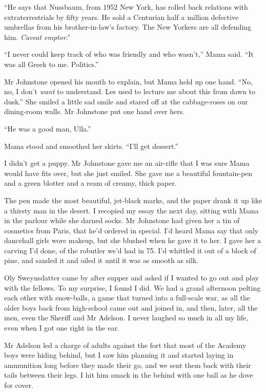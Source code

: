 ``He says that Nussbaum, from 1952 New York, has rolled back relations with 
extraterrestrials by fifty years. He sold a Centurian half a million defective 
umbrellas from his brother-in-law's factory. The New Yorkers are all defending 
him. \emph{Caveat emptor}.''

``I never could keep track of who was friendly and who wasn't,''
Mama said. ``It was all Greek to me. Politics.''

Mr Johnstone opened his mouth to explain, but Mama held up one
hand.
``No, no, I don't \emph{want} to understand. Les used to lecture me about this 
from dawn to dusk.''
She smiled a little sad smile and stared off at the cabbage-roses
on our dining-room walls. Mr Johnstone put one hand over hers.

``He was a good man, Ulla.''

Mama stood and smoothed her skirts. ``I'll get dessert.''

\tb

I didn't get a puppy. Mr Johnstone gave me an air-rifle that I was
sure Mama would have fits over, but she just smiled. She gave me a
beautiful fountain-pen and a green blotter and a ream of creamy,
thick paper.

The pen made the most beautiful, jet-black marks, and the paper
drank it up like a thirsty man in the desert. I recopied my essay
the next day, sitting with Mama in the parlour while she darned
socks. Mr Johnstone had given her a tin of cosmetics from Paris,
that he'd ordered in special. I'd heard Mama say that only
dancehall girls wore makeup, but she blushed when he gave it to
her. I gave her a carving I'd done, of the robutler we'd had in 75.
I'd whittled it out of a block of pine, and sanded it and oiled it
until it was as smooth as silk.

Oly Sweynsdatter came by after supper and asked if I wanted to go
out and play with the fellows. To my surprise, I found I did. We
had a grand afternoon pelting each other with snow-balls, a game
that turned into a full-scale war, as all the older boys back from
high-school came out and joined in, and then, later, all the men,
even the Sheriff and Mr Adelson. I never laughed so much in all my
life, even when I got one right in the ear.

Mr Adelson led a charge of adults against the fort that most of the
Academy boys were hiding behind, but I saw him planning it and
started laying in ammunition long before they made their go, and we
sent them back with their tails between their legs. I hit him smack
in the behind with one ball as he dove for cover.

